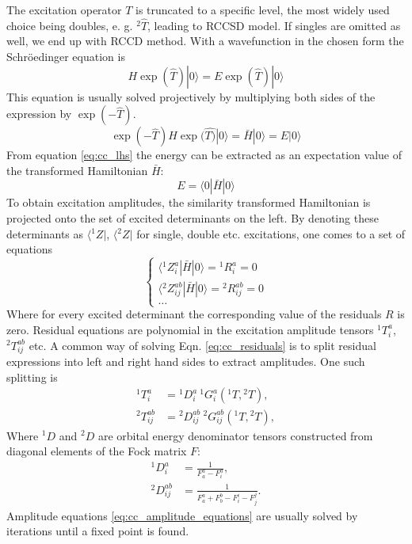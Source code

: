 The excitation operator $T$ is truncated to a specific level, the most widely 
used choice being doubles, e. g. ${}^{2}\hat{T}$, leading to RCCSD model. If 
singles are omitted as well, we end up with RCCD method. With a wavefunction in 
the chosen form the Schr{\"o}edinger equation is
%
\begin{equation}
 H \exp(\hat{T}) |0 \rangle = E \exp(\hat{T}) |0 \rangle
\end{equation}
%
This equation is usually solved projectively by multiplying both sides of the 
expression by $\exp(-\hat{T})$.
%
\begin{equation}
 \exp(-\hat{T}) H \exp(\hat{T)} | 0 \rangle = \bar{H} | 0 \rangle = E | 0 
\rangle
\label{eq:cc_lhs}
\end{equation}
%
From equation \ref{eq:cc_lhs} the energy can be extracted as an expectation 
value of the transformed Hamiltonian $\bar{H}$:
%
\begin{equation}
 E = \langle 0 | \bar{H} | 0 \rangle
\end{equation}
%
To obtain excitation amplitudes, the similarity transformed Hamiltonian 
is projected onto the set of excited determinants on the left.
By denoting these determinants as $\langle {}^{1}Z |$, $\langle {}^{2}Z|$
for single, double etc. excitations, one comes to a set of equations
%
\begin{equation}
\begin{cases}
 \langle {}^{1} Z_{i}^{a} | \bar{H} | 0 \rangle = {}^{1}R_{i}^{a} = 0 \\
 \langle {}^{2} Z_{ij}^{ab} | \bar{H} | 0 \rangle = {}^{2}R_{ij}^{ab} = 0 \\
 \ldots
\end{cases}
\label{eq:cc_residuals}
\end{equation}
%
Where for every excited determinant the corresponding value of the residuals 
$R$ is zero. Residual equations are polynomial in the excitation amplitude 
tensors ${}^{1}T_{i}^{a}$, ${}^{2}T_{ij}^{ab}$ etc. 
A common way of solving Eqn. \ref{eq:cc_residuals} is to split residual 
expressions into left and right hand sides to extract amplitudes. One such 
splitting is
\begin{subequations}
\begin{align}
 {}^{1}T_{i}^{a} &= {}^{1}D_{i}^{a} ~ {}^{1}G_{i}^{a}({}^{1}T, {}^{2}T), \\
{}^{2}T_{ij}^{ab} &= {}^{2}D_{ij}^{ab} ~ {}^{2}G_{ij}^{ab}({}^{1}T, {}^{2}T), 
\label{eq:cc_amplitude_equations_b}
\end{align}
\label{eq:cc_amplitude_equations}
\end{subequations}
Where ${}^1D$ and ${}^2D$ are orbital energy
denominator tensors constructed from diagonal elements of the Fock matrix
$F$:
%
\begin{subequations}
\begin{align} {}^1D_i^a &= \frac{1}{F_a^a - F_i^a}, \\
{}^{2}D_{ij}^{ab} &= \frac{1}{F_{a}^{a} + F_{b}^{b} - F_{i}^{i} -
F_{j}^{j}}.
\end{align}
\label{eq:cc_denom_definition}
\end{subequations} 
%
Amplitude equations \ref{eq:cc_amplitude_equations} are usually solved by 
iterations until a fixed point is found.

